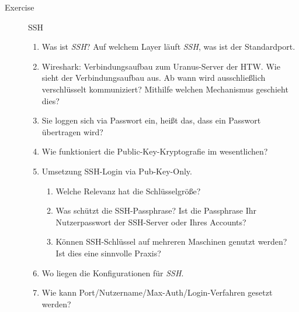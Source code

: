 \documentclass[a4paper,twoside,12pt]{article}
\newcounter{AUFGNR}
\newcommand{\AUFGABE}[2]{\vspace{0.3cm}\item[Exercise \arabic{AUFGNR}]\stepcounter{AUFGNR} #1\hfill\emph{#2}}
\begin{document}
\begin{description}
\AUFGABE{SSH}{}

\begin{enumerate}
	\item Was ist \emph{SSH}? Auf welchem Layer läuft \emph{SSH}, was ist der Standardport.
	\item Wireshark: Verbindungsaufbau zum Uranus-Server der HTW. Wie sieht der Verbindungsaufbau aus. Ab wann wird ausschließlich verschlüsselt kommuniziert? Mithilfe welchen Mechanismus geschieht dies?
	\item Sie loggen sich via Passwort ein, heißt das, dass ein Passwort übertragen wird?
	\item Wie funktioniert die Public-Key-Kryptografie im wesentlichen?
	\item Umsetzung SSH-Login via Pub-Key-Only. 
	\begin{enumerate}
		\item Welche Relevanz hat die Schlüsselgröße? 
		\item Was schützt die SSH-Passphrase? Ist die Passphrase Ihr Nutzerpasswort der SSH-Server oder Ihres Accounts?
		\item Können SSH-Schlüssel auf mehreren Maschinen genutzt werden? Ist dies eine sinnvolle Praxis?
	\end{enumerate}
	\item Wo liegen die Konfigurationen für \emph{SSH}.
	\item Wie kann Port/Nutzername/Max-Auth/Login-Verfahren gesetzt werden?
\end{enumerate}

\end{description}

\printbibliography
\end{document}
